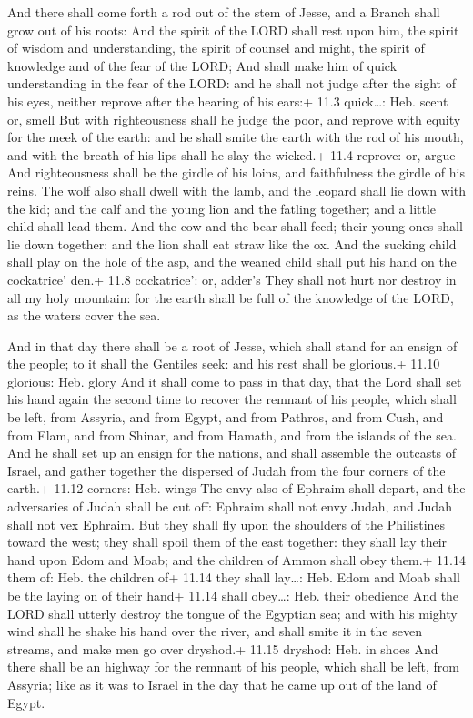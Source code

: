  And there shall come forth a rod out of the stem of Jesse,
and a Branch shall grow out of his roots:  And the spirit of
the LORD shall rest upon him, the spirit of wisdom and understanding,
the spirit of counsel and might, the spirit of knowledge and of the fear
of the LORD;  And shall make him of quick understanding in
the fear of the LORD: and he shall not judge after the sight of his
eyes, neither reprove after the hearing of his ears:+ 11.3 quick\ldots:
Heb. scent or, smell  But with righteousness shall he judge
the poor, and reprove with equity for the meek of the earth: and he
shall smite the earth with the rod of his mouth, and with the breath of
his lips shall he slay the wicked.+ 11.4 reprove: or, argue 
And righteousness shall be the girdle of his loins, and faithfulness the
girdle of his reins.  The wolf also shall dwell with the
lamb, and the leopard shall lie down with the kid; and the calf and the
young lion and the fatling together; and a little child shall lead them.
 And the cow and the bear shall feed; their young ones shall
lie down together: and the lion shall eat straw like the ox.
 And the sucking child shall play on the hole of the asp,
and the weaned child shall put his hand on the cockatrice' den.+ 11.8
cockatrice': or, adder's  They shall not hurt nor destroy in
all my holy mountain: for the earth shall be full of the knowledge of
the LORD, as the waters cover the sea.

 And in that day there shall be a root of Jesse, which
shall stand for an ensign of the people; to it shall the Gentiles seek:
and his rest shall be glorious.+ 11.10 glorious: Heb. glory
 And it shall come to pass in that day, that the Lord shall
set his hand again the second time to recover the remnant of his people,
which shall be left, from Assyria, and from Egypt, and from Pathros, and
from Cush, and from Elam, and from Shinar, and from Hamath, and from the
islands of the sea.  And he shall set up an ensign for the
nations, and shall assemble the outcasts of Israel, and gather together
the dispersed of Judah from the four corners of the earth.+ 11.12
corners: Heb. wings  The envy also of Ephraim shall depart,
and the adversaries of Judah shall be cut off: Ephraim shall not envy
Judah, and Judah shall not vex Ephraim.  But they shall fly
upon the shoulders of the Philistines toward the west; they shall spoil
them of the east together: they shall lay their hand upon Edom and Moab;
and the children of Ammon shall obey them.+ 11.14 them of: Heb. the
children of+ 11.14 they shall lay\ldots: Heb. Edom and Moab shall be the
laying on of their hand+ 11.14 shall obey\ldots: Heb. their obedience
 And the LORD shall utterly destroy the tongue of the
Egyptian sea; and with his mighty wind shall he shake his hand over the
river, and shall smite it in the seven streams, and make men go over
dryshod.+ 11.15 dryshod: Heb. in shoes  And there shall be
an highway for the remnant of his people, which shall be left, from
Assyria; like as it was to Israel in the day that he came up out of the
land of Egypt.

